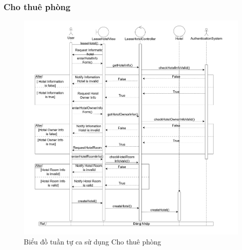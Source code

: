 \subsubsection{Cho thuê phòng}
\begin{figure}[H]
    \centering
    \includegraphics[width=\textwidth]{img2/chothuephong.png}
    \caption{Biểu đồ tuần tự ca sử dụng Cho thuê phòng}
\end{figure}

